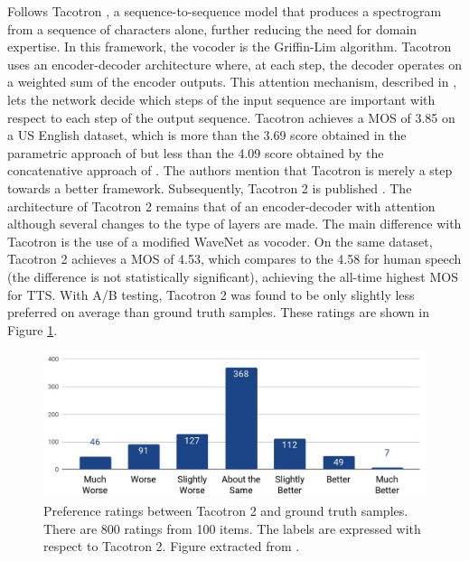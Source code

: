 \documentclass[a4paper, oneside, 12pt, english]{article}
\begin{document}

Follows Tacotron \citep{Tacotron1}, a sequence-to-sequence model that produces a spectrogram from a sequence of characters alone, further reducing the need for domain expertise. In this framework, the vocoder is the Griffin-Lim algorithm. Tacotron uses an encoder-decoder architecture where, at each step, the decoder operates on a weighted sum of the encoder outputs. This attention mechanism, described in \citep{Attention}, lets the network decide which steps of the input sequence are important with respect to each step of the output sequence. Tacotron achieves a MOS of 3.85 on a US English dataset, which is more than the 3.69 score obtained in the parametric approach of \citep{LSTM-RNN} but less than the 4.09 score obtained by the concatenative approach of \citep{ConcatenativeGoogle}. The authors mention that Tacotron is merely a step towards a better framework. Subsequently, Tacotron 2 is published \citep{Tacotron2}. The architecture of Tacotron 2 remains that of an encoder-decoder with attention although several changes to the type of layers are made. The main difference with Tacotron is the use of a modified WaveNet as vocoder. On the same dataset, Tacotron 2 achieves a MOS of 4.53, which compares to the 4.58 for human speech (the difference is not statistically significant), achieving the all-time highest MOS for TTS. With A/B testing, Tacotron 2 was found to be only slightly less preferred on average than ground truth samples. These ratings are shown in Figure \ref{tacotron2_results}.

\begin{figure}[h]
	\centering
	\includegraphics[width=.8\linewidth]{images/tacotron2_results.png}
	\caption{Preference ratings between Tacotron 2 and ground truth samples. There are 800 ratings from 100 items. The labels are expressed with respect to Tacotron 2. Figure extracted from \citep{Tacotron2}.}
	\label{tacotron2_results}
\end{figure}
\end{document}
